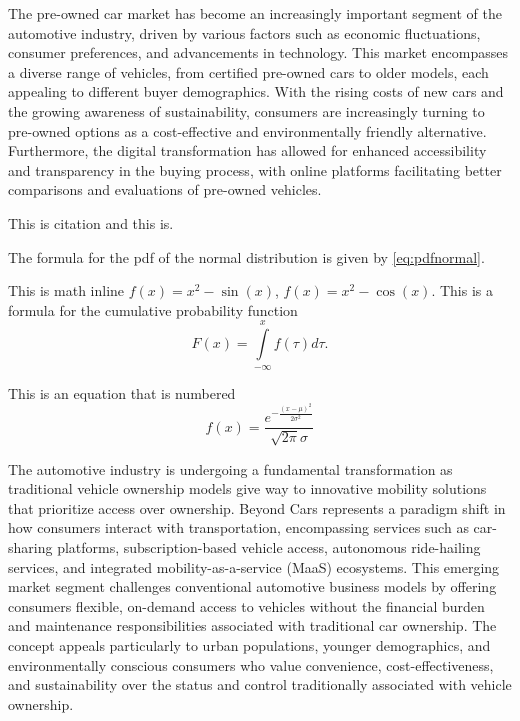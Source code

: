 \documentclass[english, twoside, 12pt, a4paper]{article}
\theoremstyle{definition}
\theoremstyle{plain}
\theoremstyle{remark}
\begin{document}
The pre-owned car market has become an increasingly important segment of the automotive industry, driven by various factors such as economic fluctuations, consumer preferences, and advancements in technology. This market encompasses a diverse range of vehicles, from certified pre-owned cars to older models, each appealing to different buyer demographics. With the rising costs of new cars and the growing awareness of sustainability, consumers are increasingly turning to pre-owned options as a cost-effective and environmentally friendly alternative. Furthermore, the digital transformation has allowed for enhanced accessibility and transparency in the buying process, with online platforms facilitating better comparisons and evaluations of pre-owned vehicles.

This is citation \textcite{vanderAalst2022} and this is.

The formula for the pdf of the normal distribution is given by \eqref{eq:pdfnormal}. 

This is math inline \(f(x) = x^2 - \sin(x)\), $f(x) = x^2 - \cos(x)$. This is a formula for the cumulative probability function
\begin{equation}
 F(x) = \int\limits_{-\infty}^{x}       
f(        \tau) d\tau                  . 
\end{equation}

This is an equation that is numbered
\begin{equation}\label{eq:pdfnormal}
f(x) = \frac{e^{-\frac{(x-\mu )^2}{2
   \sigma ^2}}}{\sqrt{2 \pi }
   \sigma } 
\end{equation}

The automotive industry is undergoing a fundamental transformation as traditional vehicle ownership models give way to innovative mobility solutions that prioritize access over ownership. Beyond Cars represents a paradigm shift in how consumers interact with transportation, encompassing services such as car-sharing platforms, subscription-based vehicle access, autonomous ride-hailing services, and integrated mobility-as-a-service (MaaS) ecosystems. This emerging market segment challenges conventional automotive business models by offering consumers flexible, on-demand access to vehicles without the financial burden and maintenance responsibilities associated with traditional car ownership. The concept appeals particularly to urban populations, younger demographics, and environmentally conscious consumers who value convenience, cost-effectiveness, and sustainability over the status and control traditionally associated with vehicle ownership.
\end{document}
